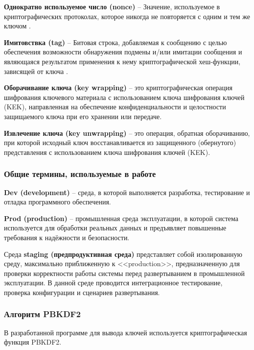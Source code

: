 \documentclass[14pt, a4paper]{extarticle}
\newcommand{\addsubsubsection}[1]{\refstepcounter{subsubsection}\addcontentsline{toc}{subsubsection}{\protect\numberline{\thesubsubsection}#1}}
\begin{document}
	\textbf{Однократно используемое число (nonce)} -- Значение, используемое в криптографических протоколах, которое никогда не повторяется с одним и тем же ключом \cite{GOST_R_34.14.2025}.
	
	\textbf{Имитовствка (tag)} -- Битовая строка, добавляемая к сообщению с целью обеспечения возможности обнаружения подмены и/или имитации сообщения и являющаяся результатом применения к нему криптографической хеш-функции, зависящей от ключа \cite{GOST_R_34.14.2025}.
	
	\textbf{Оборачивание ключа (key wrapping)} -- это криптографическая операция шифрования ключевого материала с использованием ключа шифрования ключей (KEK), направленная на обеспечение конфиденциальности и целостности защищаемого ключа при его хранении или передаче.
	
	\textbf{Извлечение ключа (key unwrapping)} -- это операция, обратная оборачиванию, при которой исходный ключ восстанавливается из защищенного (обернутого) представления с использованием ключа шифрования ключей (KEK).
		
	\subsubsection{Общие термины, используемые в работе}
	
	\textbf{Dev (development)} -- среда, в которой выполняется разработка, тестирование и отладка программного обеспечения.
	
	\textbf{Prod (production)} -- промышленная среда эксплуатации, в которой система используется для обработки реальных данных и предъявляет повышенные требования к надёжности и безопасности.
	
	Среда \textbf{staging (предпродуктивная среда)} представляет собой изолированную среду, максимально приближенную к <<production>>, предназначенную для проверки корректности работы системы перед развертыванием в промышленной эксплуатации. В данной среде проводится интеграционное тестирование, проверка конфигурации и сценариев развертывания.
		
	\subsubsection{Алгоритм PBKDF2}	
	
	\label{def:PBKDF2}
	
	В разработанной программе для вывода ключей используется криптографическая функция PBKDF2.
	
\end{document}
